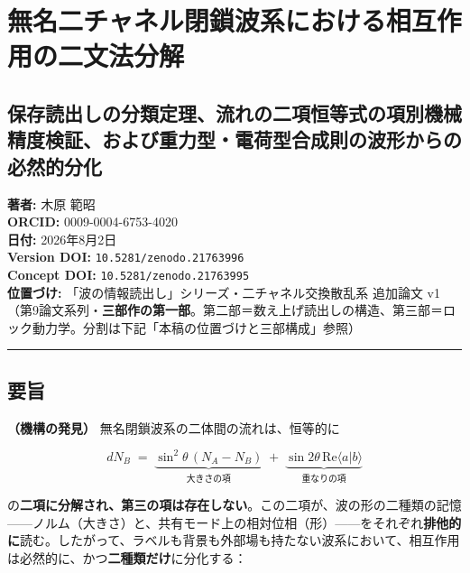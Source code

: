 \documentclass[
  a4paper,
]{ltjsarticle}
\author{}
\date{}
\begin{document}
\section{無名二チャネル閉鎖波系における相互作用の二文法分解}\label{ux7121ux540dux4e8cux30c1ux30e3ux30cdux30ebux9589ux9396ux6ce2ux7cfbux306bux304aux3051ux308bux76f8ux4e92ux4f5cux7528ux306eux4e8cux6587ux6cd5ux5206ux89e3}

\subsection{保存読出しの分類定理、流れの二項恒等式の項別機械精度検証、および重力型・電荷型合成則の波形からの必然的分化}\label{ux4fddux5b58ux8aadux51faux3057ux306eux5206ux985eux5b9aux7406ux6d41ux308cux306eux4e8cux9805ux6052ux7b49ux5f0fux306eux9805ux5225ux6a5fux68b0ux7cbeux5ea6ux691cux8a3cux304aux3088ux3073ux91cdux529bux578bux96fbux8377ux578bux5408ux6210ux5247ux306eux6ce2ux5f62ux304bux3089ux306eux5fc5ux7136ux7684ux5206ux5316}

\textbf{著者:} 木原 範昭\\
\textbf{ORCID:} 0009-0004-6753-4020\\
\textbf{日付:} 2026年8月2日\\
\textbf{Version DOI:} \texttt{10.5281/zenodo.21763996}\\
\textbf{Concept DOI:} \texttt{10.5281/zenodo.21763995}\\
\textbf{位置づけ:} 「波の情報読出し」シリーズ・二チャネル交換散乱系
追加論文
v1（第9論文系列・\textbf{三部作の第一部}。第二部＝数え上げ読出しの構造、第三部＝ロック動力学。分割は下記「本稿の位置づけと三部構成」参照）

\begin{center}\rule{0.5\linewidth}{0.5pt}\end{center}

\subsection{要旨}\label{ux8981ux65e8}

\textbf{（機構の発見）} 無名閉鎖波系の二体間の流れは、恒等的に

\[
dN_B
\;=\;
\underbrace{\sin^2\theta\,(N_A - N_B)}_{\text{大きさの項}}
\;+\;
\underbrace{\sin 2\theta\,\mathrm{Re}\langle a|b\rangle}_{\text{重なりの項}}
\]

の\textbf{二項に分解され、第三の項は存在しない}。この二項が、波の形の二種類の記憶------ノルム（大きさ）と、共有モード上の相対位相（形）------をそれぞれ\textbf{排他的に}読む。したがって、ラベルも背景も外部場も持たない波系において、相互作用は必然的に、かつ\textbf{二種類だけ}に分化する：
\end{document}
